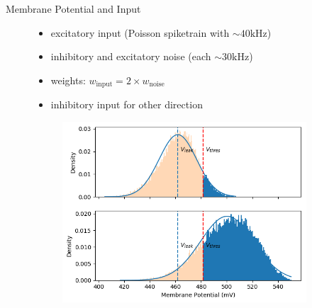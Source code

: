 \documentclass[12pt, aspectratio=169]{beamer}
\begin{document}
\begin{frame}{Membrane Potential and Input}
    \begin{figure}[!htb]
            \begin{itemize}
                \item excitatory input (Poisson spiketrain with $\sim 40 \text{kHz}$)
                \item inhibitory and excitatory noise (each $\sim 30 \text{kHz}$)
                \item weights: $w_{\text{input}} = 2 \times w_{\text{noise}}$
                \item inhibitory input for other direction
            \end{itemize}
      	\endminipage\hfill
      	    \centering
      	    \vspace{20pt}
            \begin{figure}
            
                \includegraphics[scale=0.5]{activation_function_vmem_distr_with_input_with_thres.png}
                \label{membrane_potential}
            \end{figure}
        \endminipage\hfill
    \end{figure}
\end{frame}
\end{document}
